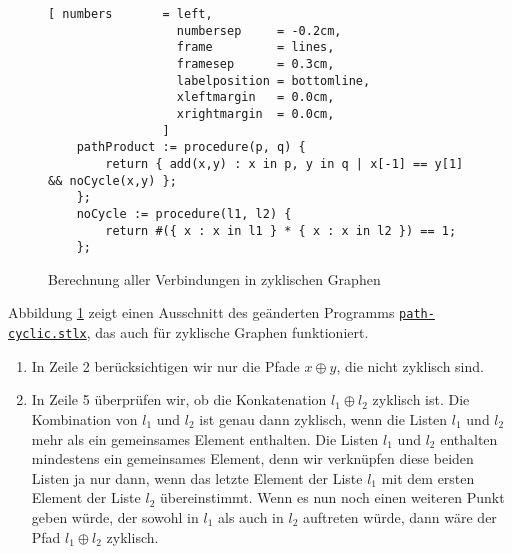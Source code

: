 \begin{figure}[!ht]
  \centering
\begin{Verbatim}[ numbers       = left,
                  numbersep     = -0.2cm,
                  frame         = lines, 
                  framesep      = 0.3cm, 
                  labelposition = bottomline,
                  xleftmargin   = 0.0cm,
                  xrightmargin  = 0.0cm,
                ]
    pathProduct := procedure(p, q) {
        return { add(x,y) : x in p, y in q | x[-1] == y[1] && noCycle(x,y) };
    };
    noCycle := procedure(l1, l2) {
        return #({ x : x in l1 } * { x : x in l2 }) == 1;
    };
\end{Verbatim} 
\vspace*{-0.3cm}
\caption{Berechnung aller Verbindungen in zyklischen Graphen}  
\label{fig:path-cyclic.stlx}
\end{figure} %

Abbildung \ref{fig:path-cyclic.stlx} zeigt einen Ausschnitt des geänderten Programms
\href{https://github.com/karlstroetmann/Logik/blob/master/SetlX/path-cyclic.stlx}{\texttt{path-cyclic.stlx}},
das auch für zyklische Graphen funktioniert. 
\begin{enumerate}
\item In Zeile 2 berücksichtigen wir nur die Pfade $x \oplus y$, die nicht zyklisch sind.
\item In Zeile 5 überprüfen wir, ob die Konkatenation  $l_1 \oplus l_2$ zyklisch ist.  Die
      Kombination von $l_1$ und $l_2$  ist genau dann 
      zyklisch, wenn die Listen $l_1$ und $l_2$ mehr als ein gemeinsames Element
      enthalten.  Die Listen $l_1$ und $l_2$ enthalten mindestens ein gemeinsames Element,
      denn wir verknüpfen diese beiden Listen ja nur dann, wenn das letzte Element
      der Liste $l_1$ mit dem ersten Element der Liste $l_2$ übereinstimmt.
      Wenn es nun noch einen weiteren Punkt geben würde, der sowohl in $l_1$ als auch in
      $l_2$ auftreten würde, dann wäre der Pfad $l_1 \oplus l_2$ zyklisch.
\end{enumerate}


